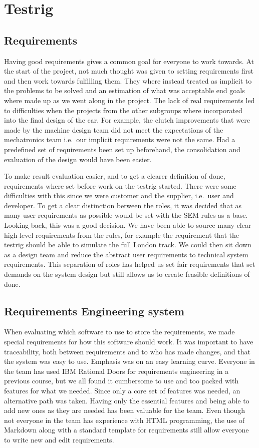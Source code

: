 \section{Testrig}
\subsection{Requirements}
Having good requirements gives a common goal for everyone to work towards. At
the start of the project, not much thought was given to setting requirements
first and then work towards fulfilling them. They where instead treated as
implicit to the problems to be solved and an estimation of what was acceptable
end goals where made up as we went along in the project. The lack of real
requirements led to difficulties when the projects from the other subgroups
where incorporated into the final design of the car. For example, the clutch
improvements that were made by the machine design team did not meet the
expectations of the mechatronics team i.e.\ our implicit requirements were not
the same. Had a predefined set of requirements been set up beforehand, the
consolidation and evaluation of the design would have been easier.

To make result evaluation easier, and to get a clearer definition of done,
requirements where set before work on the testrig started. There were some
difficulties with this since we were customer and the supplier, i.e.\ user and
developer. To get a clear distinction between the roles, it was decided that as
many user requirements as possible would be set with the SEM rules as a base.
Looking back, this was a good decision. We have been able to source many clear
high-level requirements from the rules, for example the requirement that the
testrig should be able to simulate the full London track. We could then sit down
as a design team and reduce the abstract user requirements to technical system
requirements. This separation of roles has helped us set fair requirements that
set demands on the system design but still allows us to create feasible
definitions of done. 

\subsection{Requirements Engineering system}
When evaluating which software to use to store the requirements, we made
special requirements for how this software should work. It was important to have
traceability, both between requirements and to who has made changes, and that
the system was easy to use. Emphasis was on an easy learning curve. Everyone in
the team has used IBM Rational Doors for requirements engineering in a previous
course, but we all found it cumbersome to use and too packed with features for
what we needed. Since only a core set of features was needed, an alternative
path was taken. Having only the essential features and being able to add new
ones as they are needed has been valuable for the team. Even though not everyone
in the team has experience with HTML programming, the use of Markdown along with
a standard template for requirements still allow everyone to write new and edit
requirements. 

